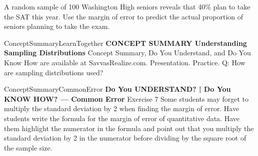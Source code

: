 \documentclass{article}
\newenvironment{tryit}[1]{}{}           %
\newenvironment{te-addendum}[2]{}{}     %
\newcommand{\answer}[1]{}               %
\begin{document}
\begin{tryit}{4}
A random sample of 100 Washington High seniors reveals that 40\% plan to take the SAT this year. Use the margin of error to predict the actual proportion of seniors planning to take the exam.
\answer{margin of error (=\frac{1}{\sqrt{n}}=10\%); The actual proportion of seniors planning to take the exam is likely to fall between 30\% and 50\%.}
\end{tryit}
\begin{te-addendum}{ConceptSummary}{LearnTogether}
\textbf{CONCEPT SUMMARY Understanding Sampling Distributions}
Concept Summary, Do You Understand, and Do You Know How are available at SavvasRealize.com. Presentation. Practice.
Q: How are sampling distributions used?
\answer{Sampling distributions are used to estimate a population parameter accurately using margin of error.}
\end{te-addendum}
\begin{te-addendum}{ConceptSummary}{CommonError}
\textbf{Do You UNDERSTAND? | Do You KNOW HOW? — Common Error}
Exercise 7 Some students may forget to multiply the standard deviation by 2 when finding the margin of error. Have students write the formula for the margin of error of quantitative data. Have them highlight the numerator in the formula and point out that you multiply the standard deviation by 2 in the numerator before dividing by the square root of the sample size.
\end{te-addendum}
\end{document}
